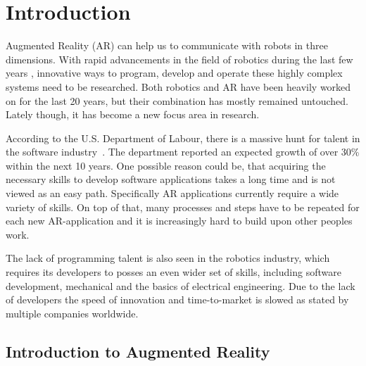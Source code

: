 \chapter{Introduction}\label{Chap:Introduction}

Augmented Reality (AR) can help us to communicate with robots in three dimensions. With rapid
advancements in the field of robotics during the last few years \cite{laschi2016soft}, innovative ways to program, develop and operate these highly complex systems need to be researched. Both robotics and AR have been heavily worked on for the last 20 years, but their combination has mostly remained untouched. Lately though, it has become a new focus area in research.

According to the U.S. Department of Labour, there is a massive hunt for talent in the software industry~\cite{blsGov}. The department reported an expected growth of over 30\% within the next 10 years. One possible reason could be, that acquiring the necessary skills to develop software applications takes a long time and is not viewed as an easy path. Specifically AR applications currently require a wide variety of skills. On top of that, many processes and steps have to be repeated for each new AR-application and it is increasingly hard to build upon other peoples work.

The lack of programming talent is also seen in the robotics industry, which requires its developers to posses an even wider set of skills, including software development, mechanical and the basics of electrical engineering. Due to the lack of developers the speed of innovation and time-to-market is slowed as stated by multiple companies worldwide.

\section{Introduction to Augmented Reality}




